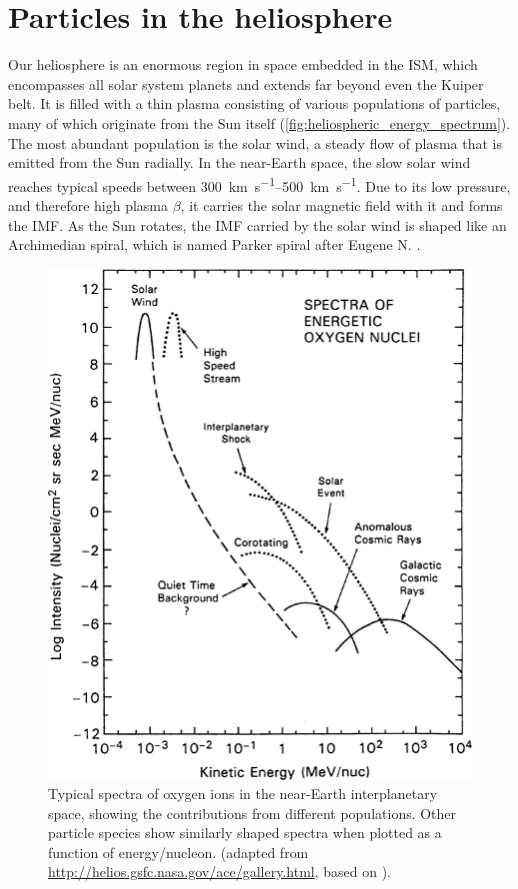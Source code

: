 \section{Particles in the heliosphere}
\label{sec:particles_heliosphere}

Our heliosphere is an enormous region in space embedded in the \ac{ISM}, which encompasses all solar system planets and extends far beyond even the Kuiper belt. 
It is filled with a thin plasma consisting of various populations of particles, many of which originate from the Sun itself (\autoref{fig:heliospheric_energy_spectrum}). 
The most abundant population is the solar wind, a steady flow of plasma that is emitted from the Sun radially. 
In the near-Earth space, the slow solar wind reaches typical speeds between \SIrange[range-phrase={\,and\,}]{300}{500}{\kilo\meter\per\second}.
Due to its low pressure, and therefore high plasma $\beta$, it carries the solar magnetic field with it and forms the \ac{IMF}.
As the Sun rotates, the \ac{IMF} carried by the solar wind is shaped like an Archimedian spiral, which is named Parker spiral after Eugene N. \citet{Parker-1958}.

\begin{figure}
    \centering
    \includegraphics[width=0.6\linewidth]{images/heliospheric_energy_spectrum}
    \caption[Spectra of oxygen ions in the near-Earth interplanetary space]{Typical spectra of oxygen ions in the near-Earth interplanetary space, showing the contributions from different populations. Other particle species show similarly shaped spectra when plotted as a function of energy/nucleon. (adapted from \url{http://helios.gsfc.nasa.gov/ace/gallery.html}, based on \citet{Mewaldt-2001}).}
    \label{fig:heliospheric_energy_spectrum}
\end{figure}

